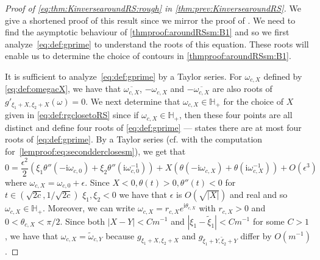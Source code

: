 \documentclass[11pt,twoside]{amsart}
\theoremstyle{plain}
\numberwithin{quest}{section}
\theoremstyle{remark}
\numberwithin{rem}{section}
\theoremstyle{definition}
\begin{document}
	\begin{proof}[Proof of \eqref{eq:thm:KinversearoundRS:rough} in \cref{thm:prev:KinversearoundRS}]
We give a shortened proof of this result since we mirror the proof of \cite[Section 3.6]{CJ16}. 
We need to find the asymptotic behaviour of \eqref{thmproof:aroundRSsm:B1} and so we first analyze~\eqref{eq:def:gprime} to understand the roots of this equation. These roots will enable us to determine the choice of contours in \eqref{thmproof:aroundRSsm:B1}. 


It is sufficient to analyze~\eqref{eq:def:gprime} by a Taylor series. 
For $\omega_{c,X}$ defined by \eqref{eq:def:omegacX},  we have that $\overline{\omega_{c,X}}$, $-\omega_{c,X}$ and $-\overline{\omega_{c,X}}$ are also roots of $g'_{\xi_1+X,\xi_2+X}(\omega)=0$. We next determine that $\omega_{c,X} \in \mathbb{H}_+$ for the choice of $X$ given in \eqref{eq:def:rgclosetoRS} since if $\omega_{c,X} \in \mathbb{H}_+$, then these four points are all distinct and define four roots of \eqref{eq:def:gprime} --- \cite[Lemma 3.7]{CJ16} states there are at most four roots of \eqref{eq:def:gprime}.   By a Taylor series (cf. with the computation for~\eqref{lemproof:eq:secondderclosesm}), we get that 
		\begin{equation*}
			0=\frac{\epsilon^2}{2}(\xi_1\theta''(-\mathrm{i} \omega_{c,0})+ \xi_2 \theta''(\mathrm{i}\omega_{c,0}^{-1})) +X(\theta(-\mathrm{i} \omega_{c,X})+\theta(\mathrm{i}\omega_{c,X}^{-1}))+O(\epsilon^3)
		\end{equation*}
		where $\omega_{c,X}=\omega_{c,0}+\epsilon$. Since $X<0,\theta(t)>0,\theta''(t)<0$ for $t \in (\sqrt{2c},1/\sqrt{2c})$ $\xi_1,\xi_2<0$ we have that $\epsilon$ is $O(\sqrt{|X|})$ and real and so $\omega_{c,X}\in \mathbb{H}_+$.   Moreover, we can write $\omega_{c,X}=r_{c,X}e^{\mathrm{i} \theta_{c,X}}$ with $r_{c,X}>0$ and $0<\theta_{c,X}<\pi/2$. Since both $|X-Y| <Cm^{-1}$ and $|\xi_1-\tilde{\xi}_1|<Cm^{-1}$ for some $C>1$ , we have that $\omega_{c,X}=\tilde{\omega}_{c,Y}$ because $g_{\xi_1+X,\xi_2+X}$ and $g_{\tilde{\xi}_1+Y,\tilde{\xi}_2+Y}$ differ by $O(m^{-1})$. 
    
    


\end{proof}
\end{document}
